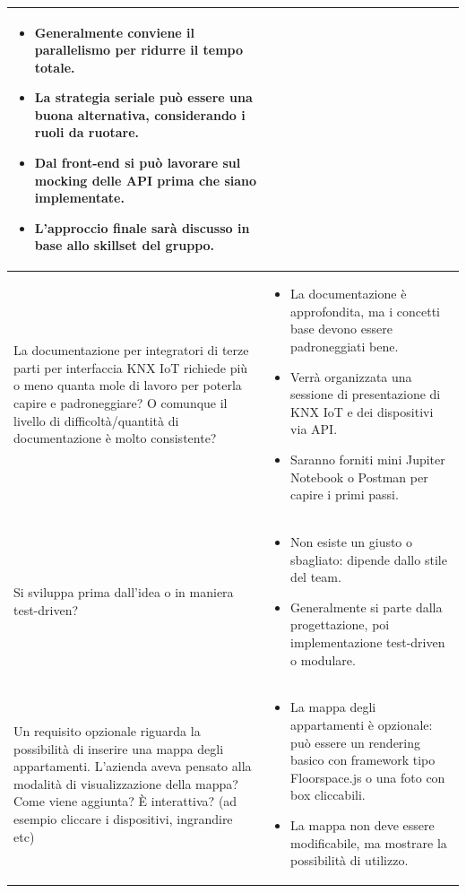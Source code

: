 \documentclass[a4paper,11pt]{article}
\begin{document}
{\begin{tabularx}{\textwidth}{|>{\raggedright\arraybackslash}X|>{\raggedright\arraybackslash}X|}
\begin{itemize}
\item Generalmente conviene il parallelismo per ridurre il tempo totale.
\item La strategia seriale può essere una buona alternativa, considerando i ruoli da ruotare.
\item Dal front-end si può lavorare sul mocking delle API prima che siano implementate.
\item L'approccio finale sarà discusso in base allo skillset del gruppo.
\end{itemize} \\
\hline
La documentazione per integratori di terze parti per interfaccia KNX IoT richiede più o meno quanta mole di lavoro per poterla capire e padroneggiare? O comunque il livello di difficoltà/quantità di documentazione è molto consistente?
&
\begin{itemize}
\item La documentazione è approfondita, ma i concetti base devono essere padroneggiati bene.
\item Verrà organizzata una sessione di presentazione di KNX IoT e dei dispositivi via API.
\item Saranno forniti mini Jupiter Notebook o Postman per capire i primi passi.
\end{itemize} \\
\hline
Si sviluppa prima dall'idea o in maniera test-driven?
&
\begin{itemize}
\item Non esiste un giusto o sbagliato: dipende dallo stile del team.
\item Generalmente si parte dalla progettazione, poi implementazione test-driven o modulare.
\end{itemize} \\
\hline
Un requisito opzionale riguarda la possibilità di inserire una mappa degli appartamenti. L'azienda aveva pensato alla modalità di visualizzazione della mappa? Come viene aggiunta? È interattiva? (ad esempio cliccare i dispositivi, ingrandire etc)
&
\begin{itemize}
\item La mappa degli appartamenti è opzionale: può essere un rendering basico con framework tipo Floorspace.js o una foto con box cliccabili.
\item La mappa non deve essere modificabile, ma mostrare la possibilità di utilizzo.
\end{itemize}\\
\hline
\end{tabularx}
}
\end{document}
